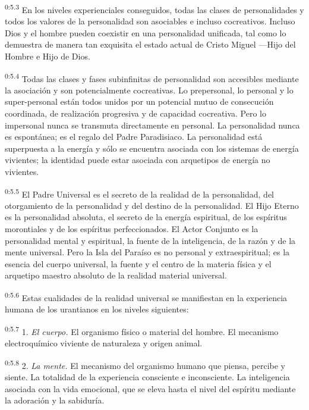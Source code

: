 \par
\textsuperscript{0:5.3} En los niveles experienciales conseguidos, todas las clases de personalidades y todos los valores de la personalidad son asociables e incluso cocreativos. Incluso Dios y el hombre pueden coexistir en una personalidad unificada, tal como lo demuestra de manera tan exquisita el estado actual de Cristo Miguel ---Hijo del Hombre e Hijo de Dios.

\par
\textsuperscript{0:5.4} Todas las clases y fases subinfinitas de personalidad son accesibles mediante la asociación y son potencialmente cocreativas. Lo prepersonal, lo personal y lo super-personal están todos unidos por un potencial mutuo de consecución coordinada, de realización progresiva y de capacidad cocreativa. Pero lo impersonal nunca se transmuta directamente en personal. La personalidad nunca es espontánea; es el regalo del Padre Paradisiaco. La personalidad está superpuesta a la energía y sólo se encuentra asociada con los sistemas de energía vivientes; la identidad puede estar asociada con arquetipos de energía no vivientes.

\par
\textsuperscript{0:5.5} El Padre Universal es el secreto de la realidad de la personalidad, del otorgamiento de la personalidad y del destino de la personalidad. El Hijo Eterno es la personalidad absoluta, el secreto de la energía espiritual, de los espíritus morontiales y de los espíritus perfeccionados. El Actor Conjunto es la personalidad mental y espiritual, la fuente de la inteligencia, de la razón y de la mente universal. Pero la Isla del Paraíso es no personal y extraespiritual; es la esencia del cuerpo universal, la fuente y el centro de la materia física y el arquetipo maestro absoluto de la realidad material universal.

\par
\textsuperscript{0:5.6} Estas cualidades de la realidad universal se manifiestan en la experiencia humana de los urantianos en los niveles siguientes:

\par
\textsuperscript{0:5.7} 1. \textit{El cuerpo.} El organismo físico o material del hombre. El mecanismo electroquímico viviente de naturaleza y origen animal.

\par
\textsuperscript{0:5.8} 2. \textit{La mente.} El mecanismo del organismo humano que piensa, percibe y siente. La totalidad de la experiencia consciente e inconsciente. La inteligencia asociada con la vida emocional, que se eleva hasta el nivel del espíritu mediante la adoración y la sabiduría.

